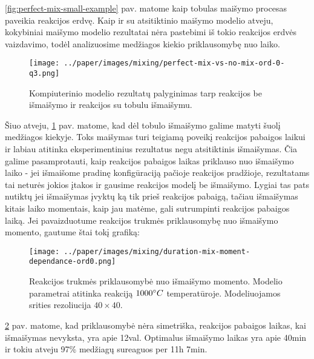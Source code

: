 \ref{fig:perfect-mix-small-example} pav. matome kaip tobulas maišymo procesas paveikia reakcijos erdvę. Kaip ir su atsitiktinio maišymo modelio atveju, kokybiniai maišymo modelio rezultatai nėra pastebimi iš tokio reakcijos erdvės vaizdavimo, todėl analizuosime medžiagos kiekio priklausomybę nuo laiko.

\newpage

\begin{figure}[h!]
    \centering
    \texttt{[image: ../paper/images/mixing/perfect-mix-vs-no-mix-ord-0-q3.png]}

    \caption{Kompiuterinio modelio rezultatų palyginimas tarp reakcijos be išmaišymo ir reakcijos su tobulu išmaišymu.  }

    \label{optimal-mix-qnt}
\end{figure}

Šiuo atveju, \ref{optimal-mix-qnt} pav. matome, kad dėl tobulo išmaišymo galime matyti šuolį medžiagos kiekyje. Toks maišymas turi teigiamą poveikį reakcijos pabaigos laikui ir labiau atitinka eksperimentinius rezultatus negu atsitiktinis išmaišymas.
Čia galime pasamprotauti, kaip reakcijos pabaigos laikas priklauso nuo išmaišymo laiko - jei išmaišome pradinę konfigūraciją pačioje reakcijos pradžioje, rezultatams tai neturės jokios įtakos ir gausime reakcijos modelį be išmaišymo. Lygiai tas pats nutiktų jei išmaišymas įvyktų ką tik prieš reakcijos pabaigą, tačiau išmaišymas kitais laiko momentais, kaip jau matėme, gali sutrumpinti reakcijos pabaigos laiką. Jei pavaizduotume reakcijos trukmės priklausomybę nuo išmaišymo momento, gautume štai tokį grafiką:

\begin{figure}[h!]
    \centering
    \texttt{[image: ../paper/images/mixing/duration-mix-moment-dependance-ord0.png]}

    \caption{Reakcijos trukmės priklausomybė nuo išmaišymo momento. Modelio parametrai atitinka reakciją $1000\degree C$ temperatūroje. Modeliuojamos srities rezoliucija $40\times40$. }

    \label{fig:duration-mix-moment-graph-for-small-space}
\end{figure}

\ref{fig:duration-mix-moment-graph-for-small-space} pav. matome, kad priklausomybė nėra simetriška, reakcijos pabaigos laikas, kai išmaišymas nevyksta, yra apie 12val. Optimalus išmaišymo laikas yra apie 40min ir tokiu atveju 97\% medžiagų sureaguos per 11h 7min.

